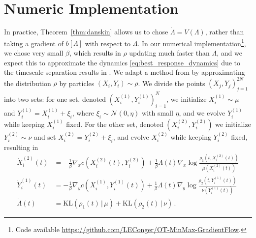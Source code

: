 \documentclass[11pt,a4paper,final]{article}
\newcommand{\KL}[2]{\text{KL}(#1\,|\,#2)}
\newcommand{\1}{\mathbf{1}}
\theoremstyle{plain}
\numberwithin{equation}{section}
\numberwithin{theorem}{section}
\begin{document}
\section{Numeric Implementation}
In practice, Theorem~\ref{thm:danskin} allows us to chose $\dot\Lambda=V(\Lambda)$, rather than taking a gradient of $b[\Lambda]$ with respect to $\Lambda$. In our numerical implementation\footnote{Code available  \href{https://github.com/LEConger/OT-MinMax-GradientFlow}{https://github.com/LEConger/OT-MinMax-GradientFlow}.}, we chose very small  $\beta$, which results in $\rho$ updating much faster than $\Lambda$, and we expect this to approximate the dynamics \eqref{eq:best_response_dynamics} due to the timescale separation results in \cite{borkar_multiple_2008}. We adapt a method from \cite{liu_approximating_2021} by approximating the distribution $\rho$ by particles $(X_i,Y_i)\sim \rho$.
We divide the points $(X_j,Y_j)_{j=1}^{2N}$ into two sets: for one set, denoted $(X^{(1)}_i,Y^{(1)}_i)_{i=1}^N$, we initialize $X_i^{(1)}\sim\mu$ and $Y_i^{(1)}=X_i^{(1)} + \xi_i$, where $\xi_i\sim \mathcal N(0,\eta)$ with small $\eta$, and we evolve $Y_i^{(1)}$ while keeping $X_i^{(1)}$ fixed. For the other set, denoted $(X^{(2)}_i,Y^{(2)}_i)$ we initialize $Y_i^{(2)}\sim\nu$ and set $X_i^{(2)}=Y_i^{(2)} + \xi_i$, and evolve $X_i^{(2)}$ while keeping $Y_i^{(2)}$ fixed, resulting in 
\begin{align*}
    \dot X_i^{(2)}(t) &= -\frac{1}{\beta}\nabla_x c(X_i^{(2)}(t),Y_i^{(2)}) + \frac{1}{\beta}\Lambda(t)\nabla_x \log \frac{\rho_1(t,X_i^{(2)}(t))}{\mu(X_i^{(2)}(t))} \\
    \dot Y_i^{(1)}(t) &= -\frac{1}{\beta}\nabla_y c(X_i^{(1)},Y_i^{(1)}(t)) + \frac{1}{\beta}\Lambda(t)\nabla_y \log \frac{\rho_2(t,Y_i^{(1)}(t))}{\nu(Y_i^{(1)}(t))}  \\
    \dot \Lambda(t) &=\KL{\rho_1(t)}{\mu} + \KL{\rho_2(t)}{\nu}\,.
\end{align*}
\end{document}
